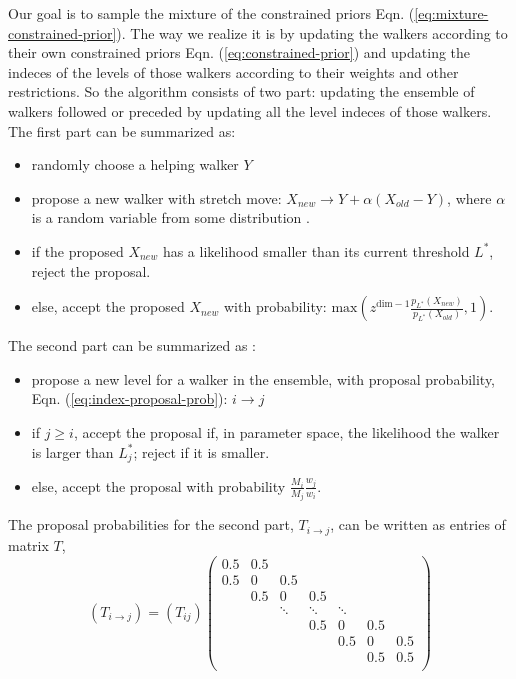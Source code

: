 \documentclass[letterpaper, preprint]{aastex}
\begin{document}
Our goal is to sample the mixture of the constrained priors Eqn. (\ref{eq:mixture-constrained-prior}). The way we realize it is by updating the walkers according to their own constrained priors Eqn. (\ref{eq:constrained-prior}) and updating the indeces of the levels of those walkers according to their weights and other restrictions. So the algorithm consists of two part: updating the ensemble of walkers followed or preceded by updating all the level indeces of those walkers. The first part can be summarized as:
\begin{sffamily}
\begin{itemize}
\item randomly choose a helping walker $Y$
\item propose a new walker with stretch move: $X_{new} \rightarrow Y + \alpha (X_{old}-Y)$, where $\alpha$ is a random variable from some distribution \citep{goodman10a}.
\item if the proposed $X_{new}$ has a likelihood smaller than its current threshold $L^*$, reject the proposal.
\item else, accept the proposed $X_{new}$ with probability: $\mathrm{max}\left(z^{\mathrm{dim}-1}\frac{p_{L^*}(X_{new})}{p_{L^*}(X_{old})},1\right)$.
\end{itemize}
\end{sffamily}
The second part can be summarized as \citep{brewer11a}:
\begin{sffamily}
\begin{itemize}
\item propose a new level for a walker in the ensemble, with proposal probability, Eqn. (\ref{eq:index-proposal-prob}): $i \rightarrow j$
\item if $j \geq i$, accept the proposal if, in parameter space, the likelihood the walker is larger than $L_j^*$; reject if it is smaller.
\item else, accept the proposal with probability $\frac{M_i}{M_j}\frac{w_j}{w_i}$.
\end{itemize}
\end{sffamily}
The proposal probabilities for the second part, $T_{i\rightarrow j}$, can be written as entries of matrix $T$,
\begin{equation}
(T_{i\rightarrow j}) = (T_{ij})
\begin{pmatrix}
0.5 & 0.5 & & & & & \\
0.5 & 0 & 0.5 & &  & & \\
 & 0.5 & 0 & 0.5 &  &  & \\
 &  & \ddots & \ddots & \ddots  &  & \\
 &  &  &  0.5 &  0 & 0.5 &  \\
 &  &  &  &  0.5 & 0 & 0.5 \\
 &  &  &  &  & 0.5 & 0.5 \\
\end{pmatrix}
\label{eq:index-proposal-prob}
\end{equation}
\end{document}
